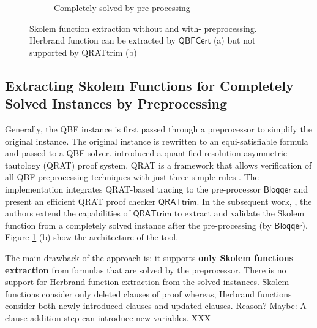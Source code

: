 \documentclass[runningheads]{llncs}
\newcommand{\qrpcert}{\mathsf{QBFCert}}
\newcommand{\qtrim}{\mathsf{QRATtrim}}
\newcommand{\bloqqer}{\mathsf{Bloqqer}}
\newcommand{\cheskol}{\mathsf{cheskol}}
\newcommand{\0}{0}
\newcommand{\1}{1}
\begin{document}
\begin{figure}
\begin{subfigure}[t]{0.5\textwidth}
	\caption{Completely solved by pre-processing}
\end{subfigure}

\caption{Skolem function extraction without and with- preprocessing. Herbrand function can be extracted by $\qrpcert$ (a) but not supported by QRATtrim (b)}\label{fig:tool}
\end{figure}

\subsection{Extracting Skolem Functions for Completely Solved Instances by Preprocessing} \label{subsec:skolem-pre}

Generally, the QBF instance is first passed through a preprocessor to simplify the original instance. The original instance is rewritten to an equi-satisfiable formula and passed to a QBF solver. \cite{HeuleSB14a} introduced a quantified resolution asymmetric tautology (QRAT) proof system. QRAT is a framework that allows verification of all QBF preprocessing techniques with just three simple rules \cite{HeuleSB14a}. The implementation integrates QRAT-based tracing to the pre-processor $\bloqqer$ \cite{Biere2011} and present an efficient QRAT proof checker $\qtrim$.
In the subsequent work, \cite{HeuleSB14}, the authors extend the capabilities of $\qtrim$ to extract and validate the Skolem function from a completely solved instance after the pre-processing (by $\bloqqer$). 
Figure \ref{fig:tool} (b) show the architecture of the tool.

The main drawback of the approach is: it supports \textbf{only Skolem functions extraction} from formulas that are solved by the preprocessor. There is no support for Herbrand function extraction from the solved instances. Skolem functions consider only deleted clauses of proof whereas, Herbrand functions consider both newly introduced clauses and updated clauses. Reason? Maybe: A clause addition step can introduce new variables. XXX
\end{document}
